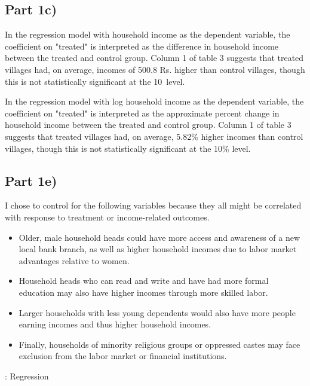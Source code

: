 \documentclass[12pt]{article}
\begin{document}
\subsection*{Part 1c)}

In the regression model with household income as the dependent variable, the coefficient on "treated" is interpreted as the difference in household income between the treated and control group. Column 1 of table 3 suggests that treated villages had, on average, incomes of 500.8 Rs. higher than control villages, though this is not statistically significant at the 10\ level.

In the regression model with log household income as the dependent variable, the coefficient on "treated" is interpreted as the approximate percent change in household income between the treated and control group. Column 1 of table 3 suggests that treated villages had, on average, 5.82\% higher incomes than control villages, though this is not statistically significant at the 10\% level.

\subsection*{Part 1e)}

I chose to control for the following variables because they all might be correlated with response to treatment or income-related outcomes.

\begin{itemize}
    \item Older, male household heads could have more access and awareness of a new local bank branch, as well as higher household incomes due to labor market advantages relative to women.

    \item Household heads who can read and write and have had more formal education may also have higher incomes through more skilled labor.

    \item Larger households with less young dependents would also have more people earning incomes and thus higher household incomes.

    \item Finally, households of minority religious groups or oppressed castes may face exclusion from the labor market or financial institutions. 

\end{itemize}


\begin{table}[H]
    \centering
    \scriptsize %
    \setlength{\tabcolsep}{2pt}
    \renewcommand{\arraystretch}{1.15}
    
    \caption{: Regression}
\end{table}
\end{document}
